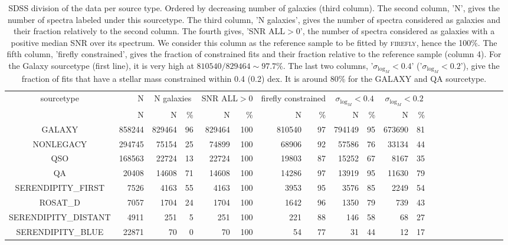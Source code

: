 \documentclass[onecolumn]{aa}
\begin{document}
\begin{table*}
\begin{center}
\caption{\label{ref:table:sdss:src:firefly}SDSS division of the data per source type. Ordered by decreasing number of galaxies (third column). 
The second column, 'N', gives the number of spectra labeled under this sourcetype. 
The third column, 'N galaxies', gives the number of spectra considered as galaxies and their fraction relatively to the second column. 
The fourth gives, 'SNR ALL$>0$', the number of spectra considered as galaxies with a positive median SNR over its spectrum. We consider this column as the reference sample to be fitted by \textsc{firefly}, hence the 100\%. 
The fifth column, 'firefly constrained', gives the fraction of constrained fits and their fraction relative to the reference sample (column 4). 
For the Galaxy sourcetype (first line), it is very high at $810540/829464 \sim 97.7\%$. 
The last two columns, '$\sigma_{\log_M}<0.4$' ('$\sigma_{\log_M}<0.2$'), give the fraction of fits that have a stellar mass constrained within 0.4 (0.2) dex. 
It is around 80\% for the GALAXY and QA sourcetype. 
}
\begin{tabular}{c rrr rrr rrrrrrrrrrrrrr}
\hline \hline
sourcetype & N & \multicolumn{2}{c}{N galaxies} & \multicolumn{2}{c}{SNR ALL$>0$} & \multicolumn{2}{c}{firefly constrained} & \multicolumn{2}{c}{$\sigma_{\log_M}<0.4$} & \multicolumn{2}{c}{$\sigma_{\log_M}<0.2$} \\ 
 & N & N & \% & N & \% & N & \% & N & \% & N & \%  \\ 
\hline 
GALAXY & 858244 & 829464 & 96 & 829464 & 100 & 810540 & 97 & 794149 & 95 & 673690 & 81 \\ 
NONLEGACY & 294745 & 75154 & 25 & 74899 & 100 & 68906 & 92 & 57586 & 76 & 33134 & 44 \\ 
QSO & 168563 & 22724 & 13 & 22724 & 100 & 19803 & 87 & 15252 & 67 & 8167 & 35 \\ 
QA & 20408 & 14608 & 71 & 14608 & 100 & 14286 & 97 & 13919 & 95 & 11630 & 79 \\ 
SERENDIPITY\_FIRST & 7526 & 4163 & 55 & 4163 & 100 & 3953 & 95 & 3576 & 85 & 2249 & 54 \\ 
ROSAT\_D & 7057 & 1704 & 24 & 1704 & 100 & 1642 & 96 & 1350 & 79 & 739 & 43 \\ 
SERENDIPITY\_DISTANT & 4911 & 251 & 5 & 251 & 100 & 221 & 88 & 146 & 58 & 68 & 27 \\ 
SERENDIPITY\_BLUE & 22871 & 70 & 0 & 70 & 100 & 54 & 77 & 31 & 44 & 12 & 17 \\ 

\end{tabular}
\end{center}
\end{table*}
\end{document}

